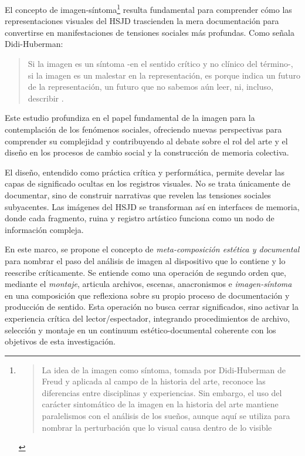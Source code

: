El concepto de imagen-síntoma\footnote{\begin{quote}La idea de la imagen como síntoma, tomada por Didi-Huberman de Freud y aplicada al campo de la historia del arte, reconoce las diferencias entre disciplinas y experiencias. Sin embargo, el uso del carácter sintomático de la imagen en la historia del arte mantiene paralelismos con el análisis de los sueños, aunque aquí se utiliza para nombrar la perturbación que lo visual causa dentro de lo visible \parencite[p. 37]{VegaArevalo2017}\end{quote}} resulta fundamental para comprender cómo las representaciones visuales del HSJD trascienden la mera documentación para convertirse en manifestaciones de tensiones sociales más profundas. Como señala Didi-Huberman:

\begin{quote}
Si la imagen es un síntoma -en el sentido crítico y no clínico del término-, si la imagen es un malestar en la representación, es porque indica un futuro de la representación, un futuro que no sabemos aún leer, ni, incluso, describir \parencite[p. 177]{DidiHuberman2011}.
\end{quote}

Este estudio profundiza en el papel fundamental de la imagen para la contemplación de los fenómenos sociales, ofreciendo nuevas perspectivas para comprender su complejidad y contribuyendo al debate sobre el rol del arte y el diseño en los procesos de cambio social y la construcción de memoria colectiva.

El diseño, entendido como práctica crítica y performática, permite develar las capas de significado ocultas en los registros visuales. No se trata únicamente de documentar, sino de construir narrativas que revelen las tensiones sociales subyacentes. Las imágenes del HSJD se transforman así en interfaces de memoria, donde cada fragmento, ruina y registro artístico funciona como un nodo de información compleja.

\textcolor{edit30sept}{En este marco, se propone el concepto de \textit{meta-composición estética y documental} para nombrar el paso del análisis de imagen al dispositivo que lo contiene y lo reescribe críticamente. Se entiende como una operación de segundo orden que, mediante el \textit{montaje}, articula archivos, escenas, anacronismos e \textit{imagen-síntoma} en una composición que reflexiona sobre su propio proceso de documentación y producción de sentido. Esta operación no busca cerrar significados, sino activar la experiencia crítica del lector/espectador, integrando procedimientos de archivo, selección y montaje en un continuum estético-documental coherente con los objetivos de esta investigación.}

